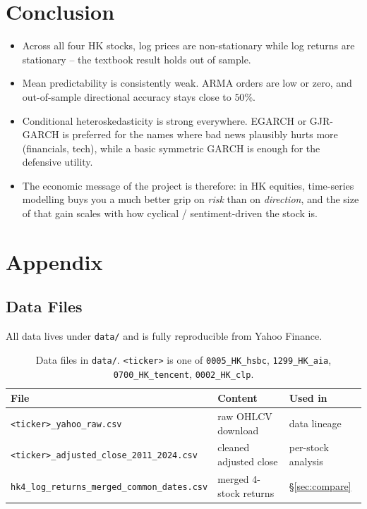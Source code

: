 \documentclass[11pt,a4paper]{article}
\begin{document}
\section{Conclusion}
\label{sec:conclusion}

\begin{itemize}[leftmargin=*]
  \item Across all four HK stocks, log prices are non-stationary while
        log returns are stationary -- the textbook result holds out of
        sample.
  \item Mean predictability is consistently weak.  ARMA orders are
        low or zero, and out-of-sample directional accuracy stays
        close to $50\%$.
  \item Conditional heteroskedasticity is strong everywhere.  EGARCH
        or GJR-GARCH is preferred for the names where bad news
        plausibly hurts more (financials, tech), while a basic
        symmetric GARCH is enough for the defensive utility.
  \item The economic message of the project is therefore: in HK
        equities, time-series modelling buys you a much better grip on
        \emph{risk} than on \emph{direction}, and the size of that
        gain scales with how cyclical / sentiment-driven the stock is.
\end{itemize}

\appendix
\section{Appendix}
\label{sec:appendix}

\subsection{Data Files}
All data lives under \texttt{data/} and is fully reproducible from
Yahoo Finance.

\begin{table}[H]
\centering
\small
\begin{tabular}{lll}
\toprule
File & Content & Used in \\
\midrule
\texttt{<ticker>\_yahoo\_raw.csv}            & raw OHLCV download           & data lineage \\
\texttt{<ticker>\_adjusted\_close\_2011\_2024.csv} & cleaned adjusted close   & per-stock analysis \\
\texttt{hk4\_log\_returns\_merged\_common\_dates.csv} & merged 4-stock returns & \S\ref{sec:compare} \\
\bottomrule
\end{tabular}
\caption{Data files in \texttt{data/}.  \texttt{<ticker>} is one of
\texttt{0005\_HK\_hsbc}, \texttt{1299\_HK\_aia},
\texttt{0700\_HK\_tencent}, \texttt{0002\_HK\_clp}.}
\end{table}
\end{document}
